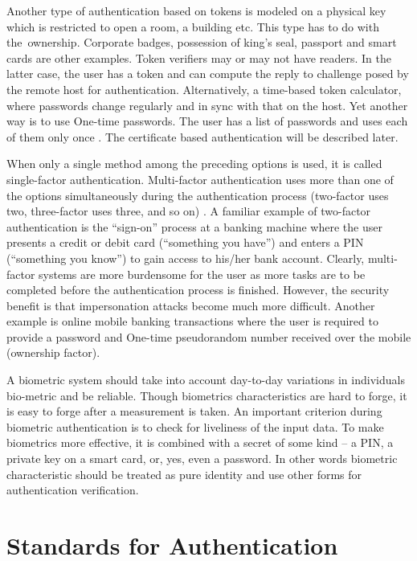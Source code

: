 \begin{multicols}{2}
Another type of authentication based on tokens is modeled on a physical key which is restricted to open a room, a building etc. This type has to do with the ownership. Corporate badges, possession of king's seal, passport and smart cards are other examples. Token verifiers may or may not have readers. In the latter case, the user has a token and can compute the reply to challenge posed by the remote host for authentication. Alternatively, a time-based token calculator, where passwords change regularly and in sync with that on the host. Yet another way is to use One-time passwords. The user has a list of passwords and uses each of them only once \cite{key2}. The certificate based authentication will be described later.

When only a single method among the preceding options is used, it is called single-factor authentication. Multi-factor authentication uses more than one of the options simultaneously during the authentication process (two-factor uses two, three-factor uses three, and so on) \cite{key2}. A familiar example of two-factor authentication is the ``sign-on'' process at a banking machine where the user presents a credit or debit card (``something you have'') and enters a PIN (``something you know'') to gain access to his/her bank account. Clearly, multi-factor systems are more burdensome for the user as more tasks are to be completed before the authentication process is finished. However, the security benefit is that impersonation attacks become much more difficult. Another example is online mobile banking transactions where the user is required to provide a password and One-time pseudorandom number received over the mobile (ownership factor).

A biometric system should take into account day-to-day variations in individuals bio-metric and be reliable. Though biometrics characteristics are hard to forge, it is easy to forge after a measurement is taken. An important criterion during biometric authentication is to check for liveliness of the input data. To make biometrics more effective, it is combined with a secret of some kind -- a PIN, a private key on a smart card, or, yes, even a password. In other words biometric characteristic should be treated as pure identity and use other forms for authentication verification.

\section*{Standards for Authentication}


\end{multicols}
